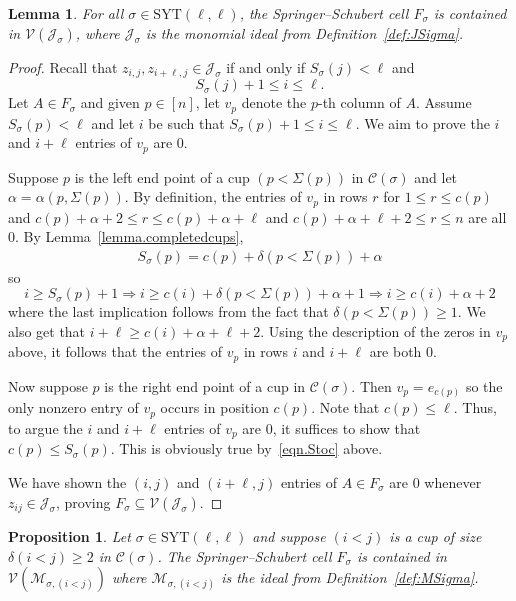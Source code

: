 \documentclass[11pt]{amsart}
\newtheorem{lemma}[theorem]{Lemma}
\newtheorem{prop}[theorem]{Proposition}
\theoremstyle{remark}
\theoremstyle{remark}
\theoremstyle{definition}
\theoremstyle{definition}
\theoremstyle{definition}
\numberwithin{equation}{section}
\newcommand{\ga}{\alpha}
\newcommand{\gd}{\delta}
\newcommand{\gs}{\sigma}
\newcommand{\cc}{\mathcal{C}}
\newcommand{\cj}{\mathcal{J}}
\newcommand{\cm}{\mathcal{M}}
\newcommand{\cv}{\mathcal{V}}
\newcommand{\SYT}{\mathrm{SYT}}
\newcommand{\al}{\alpha}
\newcommand{\E}{\Sigma}
\newcommand{\cupsigma}{\cc(\gs)}
\newcommand{\cell}{F_\gs}
\begin{document}
\begin{lemma}\label{lemma.cellinJ}
For all $\gs\in \SYT(\ell, \ell)$, the Springer--Schubert cell $\cell$ is contained in $\cv(\cj_\gs)$, where $\cj_\gs$ is the monomial ideal from Definition~\ref{def:JSigma}.
\end{lemma}

\begin{proof} Recall that $z_{i,j}, z_{i+\ell, j}\in \cj_\gs$ if and only if $S_\gs(j)<\ell$ and 
\[
S_\gs(j)+1\leq i \leq \ell.
\]
Let $A\in \cell$ and given $p\in [n]$, let $v_p$ denote the $p$-th column of $A$. Assume $S_\gs(p)<\ell$ and let $i$ be such that $S_\gs(p)+1\leq i \leq \ell$. We aim to prove the $i$ and $i+\ell$ entries of $v_p$ are $0$. 
  

Suppose $p$ is the left end point of a cup $(p<\E(p))$ in $\cupsigma$ and let $\ga=\ga(p,\E(p))$. By definition, the entries of $v_p$ in rows $r$ for $1\leq r\leq c(p)$ and $c(p)+\al+2 \leq r \leq c(p)+\al+\ell$ and $c(p)+\al+\ell+2 \leq r \leq n$ are all $0$. By Lemma~\ref{lemma.completedcups}, 
\begin{eqnarray}\label{eqn.Stoc}
S_\gs(p) = c(p)+\gd(p<\E(p))+\al
\end{eqnarray}
so
\[
i\geq S_\gs(p)+1  \Rightarrow   i \geq c(i)+\gd(p<\E(p))+\al +1  \Rightarrow  i \geq c(i)+\al+2
\]
where the last implication follows from the fact that $\gd(p<\E(p))\geq 1$. We also get that $i+\ell \geq c(i)+\al+\ell+2$. Using the description of the zeros in $v_p$ above, it follows that the entries of $v_p$ in rows $i$ and $i+\ell$ are both $0$.

Now suppose $p$ is the right end point of a cup in $\cupsigma$. Then $v_p = e_{c(p)}$ so the only nonzero entry of $v_p$ occurs in position $c(p)$. Note that $c(p)\leq \ell$. Thus, to argue the $i$ and $i+\ell$ entries of $v_p$ are $0$, it suffices to show that $c(p)\leq S_\gs(p)$. This is obviously true by~\eqref{eqn.Stoc} above.


We have shown the $(i,j)$ and $(i+\ell, j)$ entries of $A\in \cell$ are $0$ whenever $z_{ij}\in \cj_\gs$, proving $F_\gs\subseteq \cv(\cj_\gs)$.  
\end{proof}



\begin{prop}\label{lemma.cellinM} Let $\gs\in \SYT(\ell, \ell)$ and suppose $(i<j)$ is a cup of size $\gd(i<j)\geq 2$ in $\cupsigma$. The Springer--Schubert cell $\cell$ is contained in $\cv(\cm_{\gs, (i<j)})$ where $\cm_{\gs, (i<j)}$ is the ideal from Definition~\ref{def:MSigma}.  
\end{prop}
\end{document}
